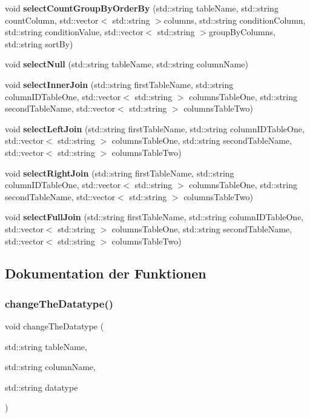 \begin{DoxyCompactItemize}
\item 
void \textbf{ select\+Count\+Group\+By\+Order\+By} (std\+::string table\+Name, std\+::string count\+Column, std\+::vector$<$ std\+::string $>$columns, std\+::string condition\+Column, std\+::string condition\+Value, std\+::vector$<$ std\+::string $>$group\+By\+Columns, std\+::string sort\+By)
\item 
void \textbf{ select\+Null} (std\+::string table\+Name, std\+::string column\+Name)
\item 
void \textbf{ select\+Inner\+Join} (std\+::string first\+Table\+Name, std\+::string column\+I\+D\+Table\+One, std\+::vector$<$ std\+::string $>$ columns\+Table\+One, std\+::string second\+Table\+Name, std\+::vector$<$ std\+::string $>$ columns\+Table\+Two)
\item 
void \textbf{ select\+Left\+Join} (std\+::string first\+Table\+Name, std\+::string column\+I\+D\+Table\+One, std\+::vector$<$ std\+::string $>$ columns\+Table\+One, std\+::string second\+Table\+Name, std\+::vector$<$ std\+::string $>$ columns\+Table\+Two)
\item 
void \textbf{ select\+Right\+Join} (std\+::string first\+Table\+Name, std\+::string column\+I\+D\+Table\+One, std\+::vector$<$ std\+::string $>$ columns\+Table\+One, std\+::string second\+Table\+Name, std\+::vector$<$ std\+::string $>$ columns\+Table\+Two)
\item 
void \textbf{ select\+Full\+Join} (std\+::string first\+Table\+Name, std\+::string column\+I\+D\+Table\+One, std\+::vector$<$ std\+::string $>$ columns\+Table\+One, std\+::string second\+Table\+Name, std\+::vector$<$ std\+::string $>$ columns\+Table\+Two)
\end{DoxyCompactItemize}


\subsection{Dokumentation der Funktionen}
\mbox{\label{sqllib_8hpp_aef4d6b8ba9c38e5f1b459694421ad9e5}} 
\subsubsection{change\+The\+Datatype()}
{\footnotesize\ttfamily void change\+The\+Datatype (\begin{DoxyParamCaption}\item[{std\+::string}]{table\+Name,  }\item[{std\+::string}]{column\+Name,  }\item[{std\+::string}]{datatype }\end{DoxyParamCaption})}

